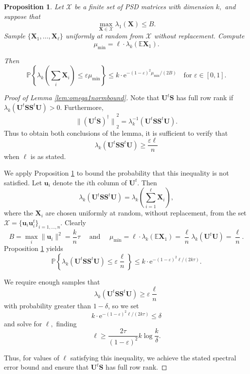 \documentclass[11pt,letterpaper,twoside,reqno,nosumlimits]{amsart}
\newcommand{\mat}[1]{\ensuremath{\bm{#1}}}
\renewcommand{\vec}[1]{\ensuremath{\bm{#1}}}
\newcommand{\e}{\ensuremath{\mathrm{e}}}
\newcommand{\E}{\ensuremath{\mathbb{E}}}
\newcommand{\Prob}[1]{\ensuremath{\mathbb{P}\left\{#1\right\}}}
\newcommand{\norm}[1]{\ensuremath{\big\|#1\big\|}}
\newtheorem{prop}{Proposition}
\theoremstyle{remark}
\begin{document}
\begin{prop}
 Let $\mathcal{X}$ be a finite set of PSD matrices with dimension $k,$ and suppose that 
\[
 \max_{\mat{X} \in \mathcal{X}} \lambda_1(\mat{X}) \leq B. 
\]
 Sample $\{\mat{X}_1, \ldots, \mat{X}_\ell\}$ uniformly at random from $\mathcal{X}$ without replacement. Compute
\[
 \mu_{\text{min}} = \ell \cdot \lambda_k(\E \mat{X}_1).
\]

Then
\[
 \Prob{ \lambda_k\left(\sum_i \mat{X}_i \right) \leq \varepsilon\mu_{\text{min}} } \leq k \cdot \e^{-(1-\varepsilon)^2 \mu_{\text{min}}/(2B)} \quad \text{for } \varepsilon \in [0,1].
\]

 \label{prop:chernoffworeplacement}
\end{prop}
 
\begin{proof}[Proof of Lemma \ref{lem:omega1normbound}]
 Note that $\mat{U}^t \mat{S}$ has full row rank if $\lambda_k(\mat{U}^t \mat{S}\mat{S}^t \mat{U}) > 0.$ Furthermore,
\[
 \norm{(\mat{U}^t \mat{S})^\dagger}_2^2 = \lambda_k^{-1}(\mat{U}^t \mat{S} \mat{S}^t \mat{U}).
\]
Thus to obtain both conclusions of the lemma, it is sufficient to verify that 
\[
\lambda_k(\mat{U}^t \mat{S}\mat{S}^t \mat{U}) \geq \frac{\varepsilon \ell}{n}
\]
when $\ell$ is as stated.

We apply Proposition \ref{prop:chernoffworeplacement} to bound the probability that this inequality is not satisfied. Let $\vec{u}_i$ denote the $i$th column of $\mat{U}^t.$ Then \[
 \lambda_k(\mat{U}^t \mat{S}\mat{S}^t \mat{U}) = \lambda_k\left( \sum_{i=1}^\ell \mat{X}_i \right),
\]
where the $\mat{X}_i$ are chosen uniformly at random, without replacement, from the set $\mathcal{X} = \{ \vec{u}_i \vec{u}_i^t \}_{i=1,\ldots,n}.$ Clearly
\[
 B = \max_i \|\vec{u}_i\|^2 = \frac{k}{n}\tau \quad \text{ and } \quad  \mu_{\text{min}} = \ell \cdot\lambda_k(\E \mat{X}_1) = \frac{\ell}{n} \lambda_k(\mat{U}^t\mat{U}) = \frac{\ell}{n}.
\]
Proposition \ref{prop:chernoffworeplacement} yields
\[
 \Prob{\lambda_k\left(\mat{U}^t \mat{S}\mat{S}^t \mat{U} \right) \leq \varepsilon \frac{\ell}{n}} \leq k \cdot \e^{-(1-\varepsilon)^2 \ell/(2 k \tau)}.
\]

We require enough samples that 
\[
\lambda_k(\mat{U}^t \mat{S}\mat{S}^t \mat{U}) \geq \varepsilon \frac{\ell}{n}
\]
with probability greater than $1 - \delta$, so we set 
\[
 k \cdot \e^{-(1-\varepsilon)^2 \ell/(2 k \tau)} \leq \delta 
\]
and solve for $\ell,$ finding
\[
 \ell \geq \frac{2\tau}{(1-\varepsilon)^2} k\log \frac{k}{\delta}.
\]

Thus, for values of $\ell$ satisfying this inequality, we achieve the stated spectral error bound and ensure that $\mat{U}^t\mat{S}$ has full row rank.
\end{proof}



\end{document}
